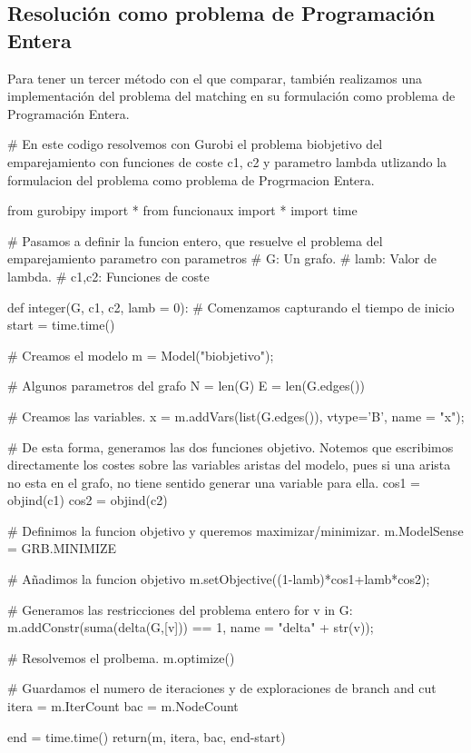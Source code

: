 \documentclass[twoside,a4paper,openright,12pt,tikz]{book}
\begin{document}
\subsection{Resolución como problema de Programación Entera}
Para tener un tercer método con el que comparar, también realizamos una implementación del problema del matching en su formulación como problema de Programación Entera.
\begin{pythone}
# En este codigo resolvemos con Gurobi el problema biobjetivo del emparejamiento con funciones de coste c1, c2 y parametro lambda utlizando la formulacion del problema como problema de Progrmacion Entera.

from gurobipy import *
from funcionaux import *
import time

# Pasamos a definir la funcion entero, que resuelve el problema del emparejamiento parametro con parametros
# G: Un grafo.
# lamb: Valor de lambda.
# c1,c2: Funciones de coste

def integer(G, c1, c2, lamb = 0):
 	# Comenzamos capturando el tiempo de inicio   
    start = time.time()
    
    # Creamos el modelo
    m = Model("biobjetivo");
   
    # Algunos parametros del grafo
    N = len(G)
    E = len(G.edges())
    
    # Creamos las variables.
    x = m.addVars(list(G.edges()), vtype='B', name = "x");
    
    # De esta forma, generamos las dos funciones objetivo. Notemos que escribimos directamente los costes sobre las variables aristas  del modelo, pues si una arista no esta en el grafo, no tiene sentido generar una variable para ella.       
    cos1 = objind(c1)
    cos2 = objind(c2)
    
    # Definimos la funcion objetivo y queremos maximizar/minimizar.
    m.ModelSense = GRB.MINIMIZE
    
    # Añadimos la funcion objetivo
    m.setObjective((1-lamb)*cos1+lamb*cos2); 
    
    # Generamos las restricciones del problema entero
    for v in G:
        m.addConstr(suma(delta(G,[v])) == 1, name = "delta" + str(v));
    
    # Resolvemos el prolbema.
    m.optimize()
    
    # Guardamos el numero de iteraciones y de exploraciones de branch and cut
    itera = m.IterCount
    bac = m.NodeCount
    
    end = time.time()
    return(m, itera, bac, end-start)
\end{pythone}
\newpage
\end{document}
